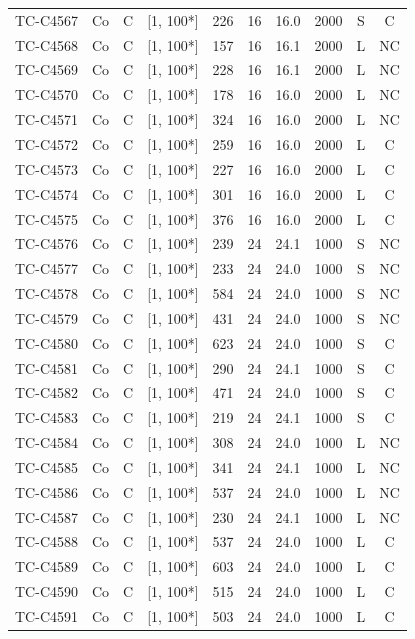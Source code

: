 \begin{longtable}{lccccccccc}
TC-C4567 & Co & C & [1, 100*] & 226 & 16 & 16.0 & 2000 & S & C \\
TC-C4568 & Co & C & [1, 100*] & 157 & 16 & 16.1 & 2000 & L & NC \\
TC-C4569 & Co & C & [1, 100*] & 228 & 16 & 16.1 & 2000 & L & NC \\
TC-C4570 & Co & C & [1, 100*] & 178 & 16 & 16.0 & 2000 & L & NC \\
TC-C4571 & Co & C & [1, 100*] & 324 & 16 & 16.0 & 2000 & L & NC \\
TC-C4572 & Co & C & [1, 100*] & 259 & 16 & 16.0 & 2000 & L & C \\
TC-C4573 & Co & C & [1, 100*] & 227 & 16 & 16.0 & 2000 & L & C \\
TC-C4574 & Co & C & [1, 100*] & 301 & 16 & 16.0 & 2000 & L & C \\
TC-C4575 & Co & C & [1, 100*] & 376 & 16 & 16.0 & 2000 & L & C \\
TC-C4576 & Co & C & [1, 100*] & 239 & 24 & 24.1 & 1000 & S & NC \\
TC-C4577 & Co & C & [1, 100*] & 233 & 24 & 24.0 & 1000 & S & NC \\
TC-C4578 & Co & C & [1, 100*] & 584 & 24 & 24.0 & 1000 & S & NC \\
TC-C4579 & Co & C & [1, 100*] & 431 & 24 & 24.0 & 1000 & S & NC \\
TC-C4580 & Co & C & [1, 100*] & 623 & 24 & 24.0 & 1000 & S & C \\
TC-C4581 & Co & C & [1, 100*] & 290 & 24 & 24.1 & 1000 & S & C \\
TC-C4582 & Co & C & [1, 100*] & 471 & 24 & 24.0 & 1000 & S & C \\
TC-C4583 & Co & C & [1, 100*] & 219 & 24 & 24.1 & 1000 & S & C \\
TC-C4584 & Co & C & [1, 100*] & 308 & 24 & 24.0 & 1000 & L & NC \\
TC-C4585 & Co & C & [1, 100*] & 341 & 24 & 24.1 & 1000 & L & NC \\
TC-C4586 & Co & C & [1, 100*] & 537 & 24 & 24.0 & 1000 & L & NC \\
TC-C4587 & Co & C & [1, 100*] & 230 & 24 & 24.1 & 1000 & L & NC \\
TC-C4588 & Co & C & [1, 100*] & 537 & 24 & 24.0 & 1000 & L & C \\
TC-C4589 & Co & C & [1, 100*] & 603 & 24 & 24.0 & 1000 & L & C \\
TC-C4590 & Co & C & [1, 100*] & 515 & 24 & 24.0 & 1000 & L & C \\
TC-C4591 & Co & C & [1, 100*] & 503 & 24 & 24.0 & 1000 & L & C \\

\end{longtable}
